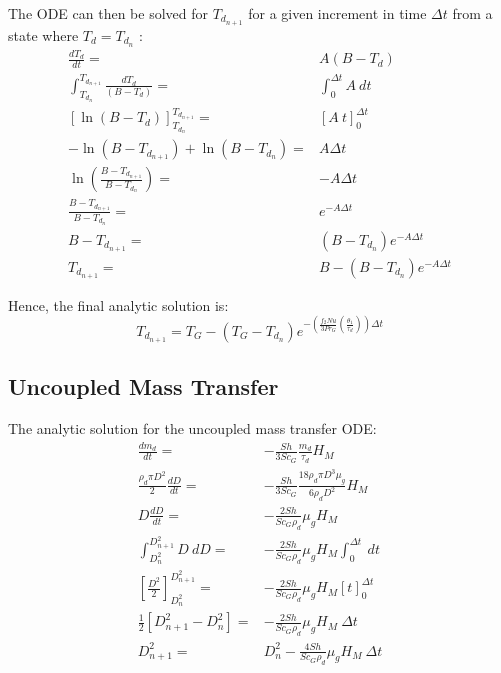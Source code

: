 \documentclass[../Interim_Report_Master]{subfiles}
\begin{document}
The ODE can then be solved for \(T_{d_{n+1}}\) for a given increment in time \(\Delta t\) from a state where \(T_d=T_{d_{n}}\) :
\begin{subequations}
\begin{align}
\frac{dT_{d}}{dt} =& A(B-T_{d}) \\
\int_{T_{d_{n}}}^{T_{d_{n+1}}} \frac{dT_d}{(B-T_d)} =& \int_{0}^{\Delta t} A~dt \\
\left[\ln(B-T_{d})\right]_{T_{d_{n}}}^{T_{d_{n+1}}} =& \left[A~t\right]_{0}^{\Delta t} \\
-\ln(B-T_{d_{n+1}}) + \ln(B-T_{d_{n}}) =& A \Delta t \\
\ln\left(\frac{B-T_{d_{n+1}}}{B-T_{d_{n}}}\right) =& -A \Delta t \\
\frac{B-T_{d_{n+1}}}{B-T_{d_{n}}} =& e^{-A \Delta t} \\
B-T_{d_{n+1}} =& (B-T_{d_{n}})e^{-A \Delta t} \\
T_{d_{n+1}} =& B - (B-T_{d_{n}})e^{-A \Delta t} 
\end{align}
\end{subequations}

Hence, the final analytic solution is:
\begin{equation}
T_{d_{n+1}} = T_G - (T_G-T_{d_{n}})e^{-\left(\frac{f_{2}Nu}{3Pr_{G}}\left(\frac{\theta_1}{\tau_d}\right)\right)\Delta t}
\end{equation}
\subsection{Uncoupled Mass Transfer}\label{uc_mass_dev}
The analytic solution for the uncoupled mass transfer ODE:
\begin{subequations}
\begin{align}
\frac{dm_d}{dt} =& -\frac{Sh}{3Sc_G}\frac{m_d}{\tau_d}H_M \\
\frac{\rho_d \pi D^2}{2}\frac{dD}{dt} =& -\frac{Sh}{3Sc_G}\frac{18 \rho_d \pi D^3 \mu_g}{6\rho_d D^2}H_M \\
D\frac{dD}{dt} =& -\frac{2Sh}{Sc_G\rho_d }\mu_g H_M  \\
\int_{D^2_n}^{D^2_{n+1}}D~dD =& -\frac{2Sh}{Sc_G\rho_d }\mu_g H_M \int_{0}^{\Delta t}~dt \\
\left[\frac{D^2}{2}\right]_{D^2_n}^{D^2_{n+1}} =& -\frac{2Sh}{Sc_G\rho_d }\mu_g H_M \left[t\right]_{0}^{\Delta t} \\
\frac{1}{2}\left[D^2_{n+1} - D^2_n\right] =& -\frac{2Sh}{Sc_G\rho_d }\mu_g H_M ~\Delta t \\
D^2_{n+1} =& D^2_n -\frac{4Sh}{Sc_G\rho_d }\mu_g H_M ~\Delta t
\end{align}
\end{subequations}
\end{document}
